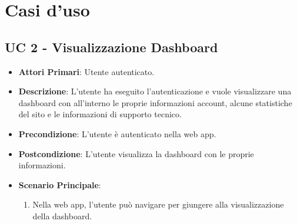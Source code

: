 \section{Casi d'uso}


		
	




		
		






		\subsection{UC 2 - Visualizzazione Dashboard}
		
		\begin{itemize}
			\item \textbf{Attori Primari}: Utente autenticato.
			\item \textbf{Descrizione}: L'utente ha eseguito l'autenticazione e vuole visualizzare una dashboard con all'interno le proprie informazioni account, alcune statistiche del sito e le informazioni di supporto tecnico.
			\item \textbf{Precondizione}: L'utente è autenticato nella web app.
			\item \textbf{Postcondizione}: L'utente visualizza la dashboard con le proprie informazioni.
			\item \textbf{Scenario Principale}:
			\begin{enumerate}
				\item Nella web app, l'utente può navigare per giungere alla visualizzazione della dashboard.
			\end{enumerate}	
		\end{itemize}

